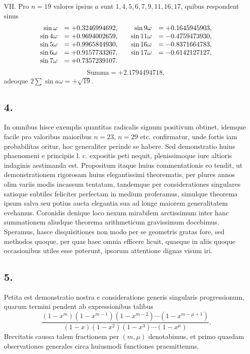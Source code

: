 \documentclass[12pt]{article}
\begin{document}
VII. Pro $n=19$ valores ipsius $a$ sunt $1,4,5,6,7,9,11,16,17$, quibus respondent sinus
\[
\begin{array}{rl@{\qquad}rl}
\sin\omega &= +0.3246994692,& \sin9\omega &= +0.1645945903,\\
\sin4\omega &= +0.9694002659,& \sin11\omega &= -0.4759473930,\\
\sin5\omega &= +0.9965844930,& \sin16\omega &= -0.8371664783,\\
\sin6\omega &= +0.9157733267,& \sin17\omega &= -0.6142127127,\\
\sin7\omega &= +0.7357239107.&
\end{array}
\]
\[
\text{Summa}=+2.1794494718,
\]
adeoque $2\sum\sin a\omega=+\sqrt{19}$.

\subsection*{4.}

In omnibus hisce exemplis quantitas radicalis signum positivum obtinet, idemque facile pro valoribus maioribus $n=23$, $n=29$ etc. confirmatur, unde fortis iam probabilitas oritur, hoc generaliter perinde se habere. Sed demonstratio huius phaenomeni e principiis l. c. expositis peti nequit, plenissimoque iure altioris indaginis aestimanda est. Propositum itaque huius commentationis eo tendit, ut demonstrationem rigorosam huius elegantissimi theorematis, per plures annos olim variis modis incassum tentatam, tandemque per considerationes singulares satisque subtiles feliciter perfectam in medium proferamus, simulque theorema ipsum salva seu potius aucta elegantia sua ad longe maiorem generalitatem evehamus. Coronidis denique loco nexum mirabilem arctissimum inter hanc summationem aliudque theorema arithmeticum gravissimum docebimus. Speramus, hasce disquisitiones non modo per se geometris gratas fore, sed methodos quoque, per quas haec omnia efficere licuit, quaeque in aliis quoque occasionibus utiles esse poterunt, ipsorum attentione dignas visum iri.

\subsection*{5.}

Petita est demonstratio nostra e consideratione generis singularis progressionum, quarum termini pendent ab expressionibus talibus
\[
\frac{(1-x^m)(1-x^{m-1})(1-x^{m-2})\cdots(1-x^{m-\mu+1})}
{(1-x)(1-x^2)(1-x^3)\cdots(1-x^\mu)}.
\]
Brevitatis caussa talem fractionem per $(m,\mu)$ denotabimus, et primo quasdam observationes generales circa huiusmodi functiones praemittemus.
\end{document}
